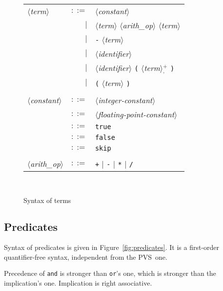 \documentclass[a4paper,12pt]{report}
\newcommand{\pvs}{\textsf{PVS}}
\newcommand{\te}[1]{\texttt{#1}}
\newcommand{\nt}[1]{$\langle$\textsl{#1}$\rangle$}
\newcommand{\plussep}[1]{$^+_#1$}
\begin{document}
\begin{figure}[htbp]
\begin{center}
\hrulefill\\
\begin{tabular}{lrl}
  \nt{term}
    & $::=$ & \nt{constant} \\
      & $|$ & \nt{term} \nt{arith\_op} \nt{term} \\
      & $|$ & \te{-} \nt{term} \\
      & $|$ & \nt{identifier} \\
      & $|$ & \nt{identifier} 
              \te{(} \nt{term}\plussep{\te{,}} \te{)} \\
      & $|$ & \te{(} \nt{term} \te{)} \\
  \\[0.1em]

  \nt{constant}
    & $::=$ & \nt{integer-constant} \\
    & $::=$ & \nt{floating-point-constant} \\
    & $::=$ & \te{true} \\
    & $::=$ & \te{false} \\
    & $::=$ & \te{skip} \\
  \\[0.1em]

  \nt{arith\_op}
    & $::=$ & \te{+} $|$ \te{-} $|$ \te{*} $|$ \te{/}
\end{tabular}\\
\hrulefill
\caption{Syntax of terms}
\label{fig:terms}
\end{center}            
\end{figure}

\subsection{Predicates}

Syntax of predicates is given in Figure~\ref{fig:predicates}.
It is a first-order quantifier-free syntax, independent from the \pvs\ one.

Precedence of \te{and} is stronger than \te{or}'s one, which is
stronger than the implication's one. Implication is right associative.
\end{document}
